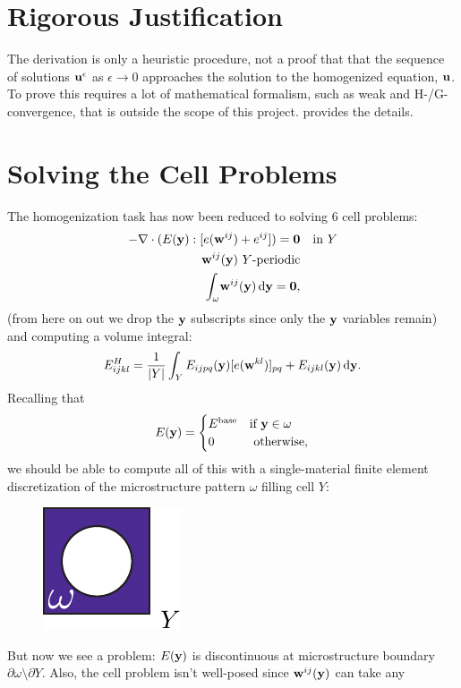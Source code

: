 \documentclass[10pt]{article}
\providecommand{\e}{\epsilon}
\begin{document}
\section{Rigorous Justification}
The derivation is only a heuristic procedure, not a proof that that the
sequence of solutions ${\bf u}^\e$ as $\e \to 0$ approaches the solution to the
homogenized equation, ${\bf u}$. To prove this requires a lot of mathematical
formalism, such as weak and H-/G-convergence, that is outside the scope of this
project. \cite{allaire2002shape} provides the details.

\section{Solving the Cell Problems}
The homogenization task has now been reduced to solving 6 cell problems:
\begin{align*}
    -\nabla \cdot (E({\bf y}) : [e({\bf w}^{ij}) + e^{ij}]) = {\bf 0} & \quad \text{in } Y \\
    {\bf w}^{ij}({\bf y})\ Y \text{-periodic} & \\
    \int_\omega \! {\bf w}^{ij}({\bf y})  \, \mathrm{d} {\bf y} =  {\bf 0}, 
\end{align*}
(from here on out we drop the ${\bf y}$ subscripts since only the ${\bf y}$
variables remain) and computing a volume integral:
$$
E^H_{ijkl} = \frac{1}{|Y|} \int_Y E_{ijpq}({\bf y}) [e({\bf w}^{kl})]_{pq} + E_{ijkl}({\bf y}) \, \mathrm{d} {\bf y}.
$$
Recalling that 
$$
E ({\bf y}) = \begin{cases} E^\text{base} & \text{if } {\bf y} \in \omega \\
                                 0 & \text{ otherwise,} \end{cases}
$$
we should be able to compute all of this with a single-material finite element discretization
of the microstructure pattern $\omega$ filling cell $Y$:
\begin{figure}[H]
    \centering
    \includegraphics[width=.16\textwidth]{Images/cell.pdf}
\end{figure}
But now we see a problem: $E({\bf y})$ is discontinuous at microstructure boundary $\partial \omega \setminus \partial Y$. Also,
the cell problem isn't well-posed since ${\bf w}^{ij}({\bf y})$ can take any
\end{document}

